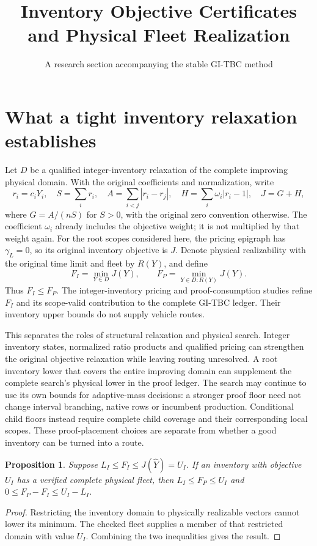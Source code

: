 \documentclass[11pt]{article}
\title{Inventory Objective Certificates and Physical Fleet Realization}
\author{A research section accompanying the stable GI-TBC method}
\date{}
\newtheorem{proposition}{Proposition}
\begin{document}
\maketitle

\section{What a tight inventory relaxation establishes}
Let $D$ be a qualified integer-inventory relaxation of the complete
improving physical domain. With the original coefficients and normalization,
write
\[
 r_i=c_iY_i,\quad S=\sum_i r_i,\quad
 A=\sum_{i<j}|r_i-r_j|,\quad
 H=\sum_i\omega_i|r_i-1|,\quad J=G+H,
\]
where $G=A/(nS)$ for $S>0$, with the original zero convention otherwise.
The coefficient $\omega_i$ already includes the objective weight; it is
not multiplied by that weight again. For the root scopes considered here,
the pricing epigraph has $\gamma_L=0$, so its original inventory objective
is $J$. Denote physical realizability with the original time limit and
fleet by $R(Y)$, and define
\[
 F_I=\min_{Y\in D}J(Y),\qquad
 F_P=\min_{Y\in D:R(Y)}J(Y).
\]
Thus $F_I\le F_P$. The integer-inventory pricing and proof-consumption
studies refine $F_I$ and its scope-valid contribution to the complete
GI-TBC ledger. Their inventory upper bounds do not supply vehicle routes.

This separates the roles of structural relaxation and physical search.
Integer inventory states, normalized ratio products and qualified pricing
can strengthen the original objective relaxation while leaving routing
unresolved. A root inventory lower that covers the entire improving
domain can supplement the complete search's physical lower in the proof
ledger. The search may continue to use its own bounds for adaptive-mass
decisions: a stronger proof floor need not change interval branching,
native rows or incumbent production. Conditional child floors instead
require complete child coverage and their corresponding local scopes.
These proof-placement choices are separate from whether a good inventory
can be turned into a route.

\begin{proposition}
Suppose $L_I\le F_I\le J(\widehat Y)=U_I$. If an inventory with objective
$U_I$ has a verified complete physical fleet, then
$L_I\le F_P\le U_I$ and $0\le F_P-F_I\le U_I-L_I$.
\end{proposition}
\begin{proof}
Restricting the inventory domain to physically realizable vectors cannot
lower its minimum. The checked fleet supplies a member of that restricted
domain with value $U_I$. Combining the two inequalities gives the result.
\end{proof}
\end{document}
